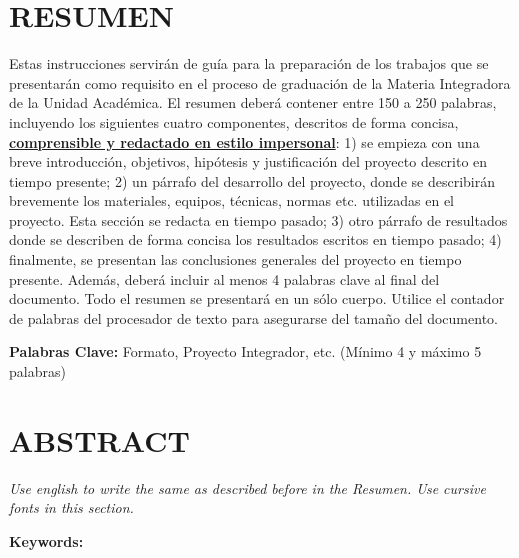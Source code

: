 \chapter{RESUMEN}

Estas instrucciones servir\'an de guía para la preparaci\'on de los trabajos que se presentar\'an como requisito en el proceso de graduaci\'on de la Materia Integradora de la Unidad Acad\'emica. El resumen deber\'a contener entre 150 a 250 palabras, incluyendo los siguientes cuatro componentes, descritos de forma concisa, \textbf{ \underline{comprensible y redactado en estilo impersonal}}: 1) se empieza con una breve introducci\'on, objetivos, hip\'otesis y justificaci\'on del proyecto descrito en tiempo presente; 2) un p\'arrafo del desarrollo del proyecto, donde se describir\'an brevemente los materiales, equipos, t\'ecnicas, normas etc. utilizadas en el proyecto. Esta secci\'on se redacta en tiempo pasado; 3) otro p\'arrafo de resultados donde se describen de forma concisa los resultados escritos en tiempo pasado; 4) finalmente, se presentan las conclusiones generales del proyecto en tiempo presente. Adem\'as, deber\'a incluir al menos 4 palabras clave al final del documento. Todo el resumen se presentar\'a en un s\'olo cuerpo. Utilice el contador de palabras del procesador de texto para asegurarse del tamaño del documento. 

\textbf{Palabras Clave:} Formato, Proyecto Integrador, etc. (M\'inimo 4 y m\'aximo 5 palabras)



\chapter{ABSTRACT}

\textit{Use english to write the same as described before in the Resumen. Use cursive fonts in this section.}

\textbf{Keywords:} 

